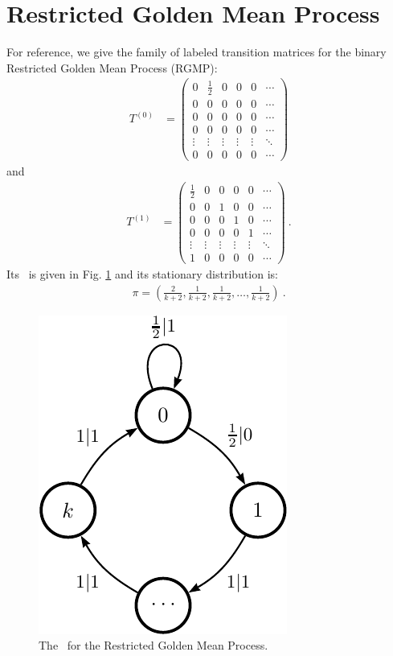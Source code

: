 \section{Restricted Golden Mean Process}

For reference, we give the family of labeled transition matrices
for the binary Restricted Golden Mean Process (RGMP):
\begin{align*}
T^{(0)} & = \begin{pmatrix}
0 & \frac{1}{2} & 0 & 0 & 0 &\cdots\\
0 & 0 & 0 & 0 & 0 & \cdots\\
0 & 0 & 0 & 0 & 0 & \cdots\\
0 & 0 & 0 & 0 & 0 & \cdots\\
\vdots & \vdots & \vdots & \vdots & \vdots & \ddots\\
0 & 0 & 0 & 0 & 0 & \cdots
\end{pmatrix}
\end{align*}
and
\begin{align*}
T^{(1)} & = \begin{pmatrix}
\frac{1}{2} & 0 & 0 & 0 & 0 &\cdots\\
0 & 0 & 1 & 0 & 0 & \cdots\\
0 & 0 & 0 & 1 & 0 & \cdots\\
0 & 0 & 0 & 0 & 1 & \cdots\\
\vdots & \vdots & \vdots & \vdots & \vdots & \ddots\\
1 & 0 & 0 & 0 & 0 & \cdots
\end{pmatrix} ~.
\end{align*}
Its \eM\ is given in Fig. \ref{fig:RestrictedGM} and its stationary
distribution is:
\begin{align*}
\pi = \left(\frac{2}{k+2}, \frac{1}{k+2}, \frac{1}{k+2},
  \ldots, \frac{1}{k+2}\right) ~.
\end{align*}

\begin{figure}[th]
\begin{center}
\includegraphics{../chapter4/figures/restrictedgm_feM_ur}
\caption{The \eM\ for the Restricted Golden Mean Process.}
\label{fig:RestrictedGM}
\end{center}
\end{figure}


